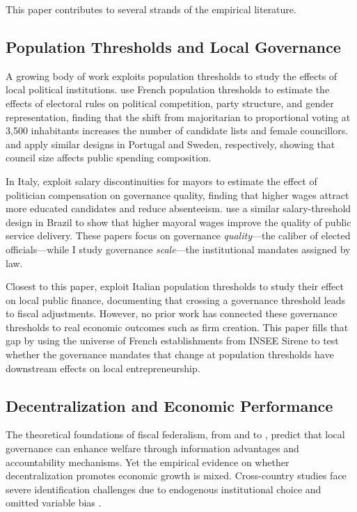 \documentclass[12pt]{article}
\begin{document}
This paper contributes to several strands of the empirical literature.

\subsection{Population Thresholds and Local Governance}

A growing body of work exploits population thresholds to study the effects of local political institutions. \citet{eggers2018} use French population thresholds to estimate the effects of electoral rules on political competition, party structure, and gender representation, finding that the shift from majoritarian to proportional voting at 3,500 inhabitants increases the number of candidate lists and female councillors. \citet{lopes2017} and \citet{pettersson2008} apply similar designs in Portugal and Sweden, respectively, showing that council size affects public spending composition.

In Italy, \citet{gagliarducci2013} exploit salary discontinuities for mayors to estimate the effect of politician compensation on governance quality, finding that higher wages attract more educated candidates and reduce absenteeism. \citet{ferraz2011} use a similar salary-threshold design in Brazil to show that higher mayoral wages improve the quality of public service delivery. These papers focus on governance \textit{quality}---the caliber of elected officials---while I study governance \textit{scale}---the institutional mandates assigned by law.

Closest to this paper, \citet{bordignon2017} exploit Italian population thresholds to study their effect on local public finance, documenting that crossing a governance threshold leads to fiscal adjustments. However, no prior work has connected these governance thresholds to real economic outcomes such as firm creation. This paper fills that gap by using the universe of French establishments from INSEE Sirene to test whether the governance mandates that change at population thresholds have downstream effects on local entrepreneurship.

\subsection{Decentralization and Economic Performance}

The theoretical foundations of fiscal federalism, from \citet{tiebout1956} and \citet{oates1972} to \citet{bardhan2002}, predict that local governance can enhance welfare through information advantages and accountability mechanisms. Yet the empirical evidence on whether decentralization promotes economic growth is mixed. Cross-country studies face severe identification challenges due to endogenous institutional choice and omitted variable bias \citep{rodrik2004}.
\end{document}
